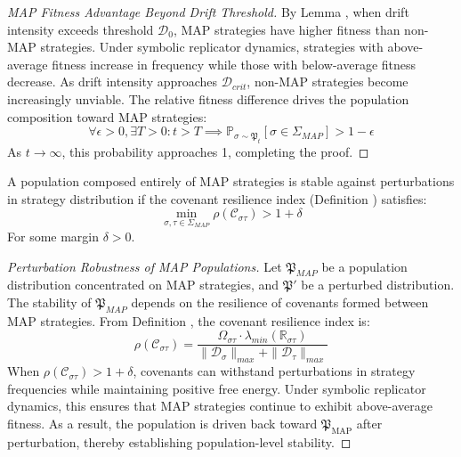 \begin{proof}[MAP Fitness Advantage Beyond Drift Threshold]
\label{proof:bk5_map_fitness_threshold}
By Lemma , when drift intensity exceeds threshold $\mathcal{D}_0$, MAP strategies have higher fitness than non-MAP strategies.
Under symbolic replicator dynamics, strategies with above-average fitness increase in frequency while those with below-average fitness decrease. As drift intensity approaches $\mathcal{D}_{crit}$, non-MAP strategies become increasingly unviable.
The relative fitness difference drives the population composition toward MAP strategies:
\begin{equation}
\forall \epsilon > 0, \exists T > 0 : t > T \implies \mathbb{P}_{\sigma \sim \mathfrak{P}_t}[\sigma \in \Sigma_{MAP}] > 1 - \epsilon
\end{equation}
As $t \to \infty$, this probability approaches 1, completing the proof.
\end{proof}
\begin{lemma}
\label{lemma:bk5_map_population_stability}
A population composed entirely of MAP strategies is stable against perturbations in strategy distribution if the covenant resilience index (Definition ) satisfies:
\begin{equation}
\min_{\sigma, \tau \in \Sigma_{MAP}} \rho(\mathcal{C}_{\sigma\tau}) > 1 + \delta
\end{equation}
For some margin $\delta > 0$.
\end{lemma}
\begin{proof}[Perturbation Robustness of MAP Populations]
\label{proof:bk5_map_perturbation_robustness}
Let $\mathfrak{P}_{MAP}$ be a population distribution concentrated on MAP strategies, and $\mathfrak{P}'$ be a perturbed distribution.
The stability of $\mathfrak{P}_{MAP}$ depends on the resilience of covenants formed between MAP strategies. From Definition , the covenant resilience index is:
\begin{equation}
\rho(\mathcal{C}_{\sigma\tau}) = \frac{\Omega_{\sigma\tau} \cdot \lambda_{min}(\mathbb{R}_{\sigma\tau})}{\|\mathcal{D}_\sigma\|_{max} + \|\mathcal{D}_\tau\|_{max}}
\end{equation}
When $\rho(\mathcal{C}_{\sigma\tau}) > 1 + \delta$, covenants can withstand perturbations in strategy frequencies while maintaining positive free energy.
Under symbolic replicator dynamics, this ensures that MAP strategies 
continue to exhibit above-average fitness. 
As a result, the population is driven back toward \( \mathfrak{P}_{\text{MAP}} \) after perturbation, 
thereby establishing population-level stability.
\end{proof}
